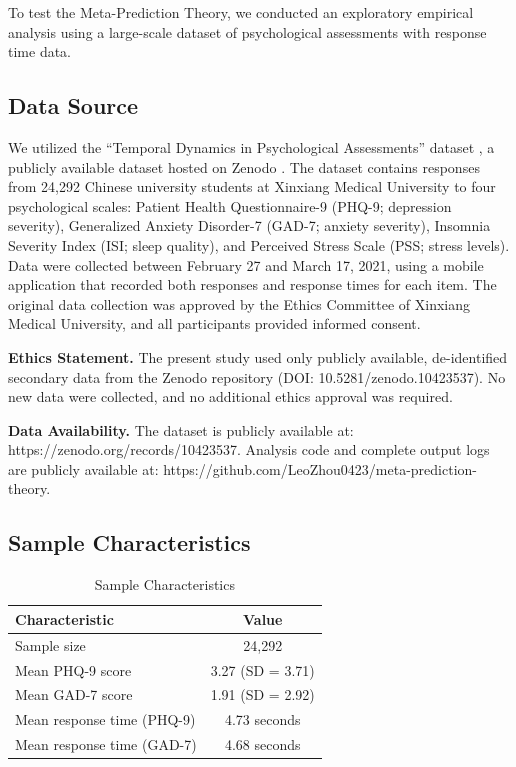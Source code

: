\documentclass[10pt,twocolumn]{article}
\begin{document}
To test the Meta-Prediction Theory, we conducted an exploratory empirical analysis using a large-scale dataset of psychological assessments with response time data.

\subsection{Data Source}

We utilized the ``Temporal Dynamics in Psychological Assessments'' dataset \citep{su2024temporal}, a publicly available dataset hosted on Zenodo \citep{su2023zenodo}. The dataset contains responses from 24,292 Chinese university students at Xinxiang Medical University to four psychological scales: Patient Health Questionnaire-9 (PHQ-9; depression severity), Generalized Anxiety Disorder-7 (GAD-7; anxiety severity), Insomnia Severity Index (ISI; sleep quality), and Perceived Stress Scale (PSS; stress levels). Data were collected between February 27 and March 17, 2021, using a mobile application that recorded both responses and response times for each item. The original data collection was approved by the Ethics Committee of Xinxiang Medical University, and all participants provided informed consent.

\textbf{Ethics Statement.} The present study used only publicly available, de-identified secondary data from the Zenodo repository (DOI: 10.5281/zenodo.10423537). No new data were collected, and no additional ethics approval was required.

\textbf{Data Availability.} The dataset is publicly available at: https://zenodo.org/records/10423537. Analysis code and complete output logs are publicly available at: https://github.com/LeoZhou0423/meta-prediction-theory.

\subsection{Sample Characteristics}

\begin{table}[t]
\centering
\caption{Sample Characteristics}
\label{tab:sample}
\begin{tabular}{@{}lc@{}}
\toprule
\textbf{Characteristic} & \textbf{Value} \\
\midrule
Sample size & 24,292 \\
Mean PHQ-9 score & 3.27 (SD = 3.71) \\
Mean GAD-7 score & 1.91 (SD = 2.92) \\
Mean response time (PHQ-9) & 4.73 seconds \\
Mean response time (GAD-7) & 4.68 seconds \\
\bottomrule
\end{tabular}
\end{table}
\end{document}
